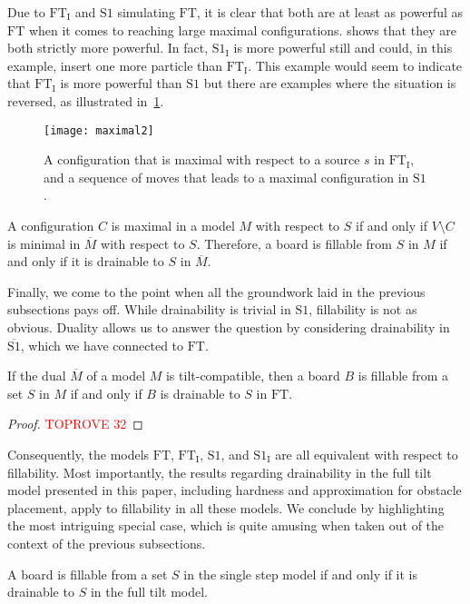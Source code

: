 \documentclass[a4paper,UKenglish,cleveref,thm-restate]{lipics-v2021}
\newcommand{\FT}{\ensuremath{\mathrm{FT}}\xspace}
\newcommand{\SSt}{\ensuremath{\mathrm{S1}}\xspace}
\newcommand{\IE}[1][\FT]{\ensuremath{{#1}_\mathrm{I}}\xspace}
\newcommand{\dual}[1]{\ensuremath{\overline{#1}}\xspace}
\begin{document}
Due to \IE and \SSt simulating \FT, it is clear that both are at least as
powerful as \FT when it comes to reaching large maximal
configurations.  shows that they are both strictly more
powerful. In fact, \IE[\SSt] is more powerful still and could, in this example,
insert one more particle than \IE. This example would seem to indicate that \IE
is more powerful than \SSt but there are examples where the situation is
reversed, as illustrated in~\cref{fig:maximal2}.

\begin{figure}[htb]
	\centering
	\texttt{[image: maximal2]}\caption{A configuration that is maximal with respect to a source $s$ in \IE,
		and a sequence of moves that leads to a maximal configuration in
		\SSt.}\label{fig:maximal2}
\end{figure}

\begin{observation}\label{obs:minmax}
A configuration $C$ is maximal in a model $M$ with respect to $S$ if and only if
$V \setminus C$ is minimal in $\dual{M}$ with respect to $S$. Therefore, a
board is fillable from $S$ in $M$ if and only if it is drainable to $S$ in
$\dual{M}$.
\end{observation}

Finally, we come to the point when all the groundwork laid in the previous
subsections pays off. While drainability is trivial in \SSt,
fillability is not as obvious. Duality allows us to answer the question by
considering drainability in $\dual{\SSt}$, which we have connected to \FT.

\begin{theorem}\label{thm:tc-fill}
If the dual $\dual{M}$ of a model $M$ is tilt-compatible, then a board $B$ is
fillable from a set $S$ in $M$ if and only if $B$ is drainable to $S$ in \FT.
\end{theorem}
\begin{proof}\textcolor{red}{TOPROVE 32}\end{proof}

Consequently, the models \FT, \IE, \SSt, and \IE[\SSt] are all
equivalent with respect to fillability. Most importantly, the results regarding
drainability in the full tilt model presented in this paper, including hardness
and approximation for obstacle placement, apply to fillability in all these
models. We conclude by highlighting the most intriguing special case, which is
quite amusing when taken out of the context of the previous subsections.

\begin{corollary}\label{cor:s1-fill}
A board is fillable from a set $S$ in the single step model if and only if it is
drainable to $S$ in the full tilt model.
\end{corollary}
\end{document}
